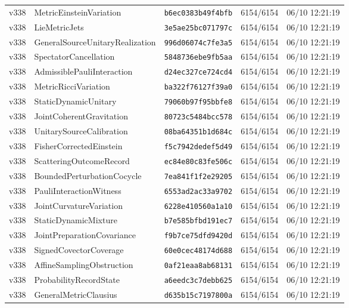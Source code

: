 \documentclass[11pt]{article}
\theoremstyle{definition}\newtheorem{deriv}{Derivation}
\begin{document}
{\begin{longtable}{@{}lllll@{}}
v338 & MetricEinsteinVariation & \texttt{b6ec0383b49f4bfb} & 6154/6154 & 06/10 12:21:19 \\
v338 & LieMetricJets & \texttt{3e5ae25bc071797c} & 6154/6154 & 06/10 12:21:19 \\
v338 & GeneralSourceUnitaryRealization & \texttt{996d06074c7fe3a5} & 6154/6154 & 06/10 12:21:19 \\
v338 & SpectatorCancellation & \texttt{5848736ebe9fb5aa} & 6154/6154 & 06/10 12:21:19 \\
v338 & AdmissiblePauliInteraction & \texttt{d24ec327ce724cd4} & 6154/6154 & 06/10 12:21:19 \\
v338 & MetricRicciVariation & \texttt{ba322f76127f39a0} & 6154/6154 & 06/10 12:21:19 \\
v338 & StaticDynamicUnitary & \texttt{79060b97f95bbfe8} & 6154/6154 & 06/10 12:21:19 \\
v338 & JointCoherentGravitation & \texttt{80723c5484bcc578} & 6154/6154 & 06/10 12:21:19 \\
v338 & UnitarySourceCalibration & \texttt{08ba64351b1d684c} & 6154/6154 & 06/10 12:21:19 \\
v338 & FisherCorrectedEinstein & \texttt{f5c7942dedef5d49} & 6154/6154 & 06/10 12:21:19 \\
v338 & ScatteringOutcomeRecord & \texttt{ec84e80c83fe506c} & 6154/6154 & 06/10 12:21:19 \\
v338 & BoundedPerturbationCocycle & \texttt{7ea841f1f2e29205} & 6154/6154 & 06/10 12:21:19 \\
v338 & PauliInteractionWitness & \texttt{6553ad2ac33a9702} & 6154/6154 & 06/10 12:21:19 \\
v338 & JointCurvatureVariation & \texttt{6228e410560a1a10} & 6154/6154 & 06/10 12:21:19 \\
v338 & StaticDynamicMixture & \texttt{b7e585bfbd191ec7} & 6154/6154 & 06/10 12:21:19 \\
v338 & JointPreparationCovariance & \texttt{f9b7ce75dfd9420d} & 6154/6154 & 06/10 12:21:19 \\
v338 & SignedCovectorCoverage & \texttt{60e0cec48174d688} & 6154/6154 & 06/10 12:21:19 \\
v338 & AffineSamplingObstruction & \texttt{0af21eaa8ab68131} & 6154/6154 & 06/10 12:21:19 \\
v338 & ProbabilityRecordState & \texttt{a6eedc3c7debb625} & 6154/6154 & 06/10 12:21:19 \\
v338 & GeneralMetricClausius & \texttt{d635b15c7197800a} & 6154/6154 & 06/10 12:21:19 \\

\end{longtable}}
\end{document}
